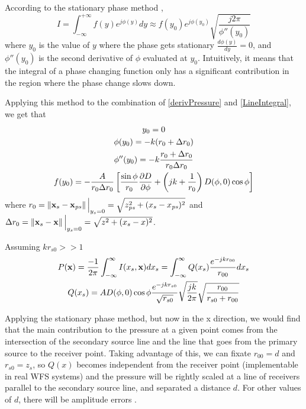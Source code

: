 According to the stationary phase method \cite{Verheijen},
\begin{equation}
I = \int_{-\infty}^{+\infty} f(y) e^{j\phi(y)} dy \approx f(y_0) e^{j\phi(y_0)} \sqrt{\frac{j 2\pi}{\phi''(y_0)}}
\end{equation}
where $y_0$ is the value of $y$ where the phase gets stationary $\frac{d\phi(y)}{dy} = 0$, and $\phi''(y_0)$ is the second derivative of $\phi$ evaluated at $y_0$. Intuitively, it means that the integral of a phase changing function only has a significant contribution in the region where the phase change slows down.

Applying this method to the combination of \autoref{derivPressure} and \autoref{LineIntegral}, we get that
\begin{gather}
	y_0 = 0 \\
	\phi(y_0) = -k(\distLinePrimSource + \distLinePoint) \\
	\phi''(y_0) = -k\frac{\distLinePrimSource + \distLinePoint}{\distLinePrimSource \distLinePoint} \\
	f(y_0) = -\frac{A}{\distLinePrimSource \distLinePoint}\left[ \frac{\sin\phi}{\distLinePrimSource} \frac{\partial\Diag}{\partial\phi} + \left(jk + \frac{1}{\distLinePrimSource}\right) \Diag(\phi, 0) \cos\phi \right]
\end{gather}
where $\distLinePrimSource = \norm{\PosTheo[surface] - \PosTheo[primarySource]}\Big\vert_{y_s = 0} = \sqrt{z_\mathit{ps}^2 + (x_s - x_\mathit{ps})^2}$ and $\distLinePoint = \norm{\PosTheo[surface] - \PosTheo}\Big\vert_{y_s = 0} = \sqrt{z^2 + (x_s - x)^2}$.

Assuming $kr_{s0} >> 1$
\begin{gather}
P(\PosTheo) = \frac{-1}{2\pi} \int_{-\infty}^{\infty} I(x_s, \PosTheo) dx_s = \int_{-\infty}^{\infty} Q(x_s) \frac{e^{-jkr_{00}}}{r_{00}} dx_s \label{RaileighI2.5}\\ 
Q(x_s) = A \Diag(\phi, 0) \cos\phi \frac{e^{-jk r_{s0}}}{\sqrt{r_{s0}}} \sqrt{\frac{jk}{2\pi}} \sqrt{\frac{r_{00}}{r_{s0} + r_{00}}}
\end{gather}

Applying the stationary phase method, but now in the x direction, we would find that the main contribution to the pressure at a given point comes from the intersection of the secondary source line and the line that goes from the primary source to the receiver point. Taking advantage of this, we can fixate $r_{00} = d$ and $r_{s0} = z_s$, so $Q(x)$ becomes independent from the receiver point (implementable in real WFS systems) and the pressure will be rightly scaled at a line of receivers parallel to the secondary source line, and separated a distance $d$. For other values of $d$, there will be amplitude errors \cite{Verheijen}.

